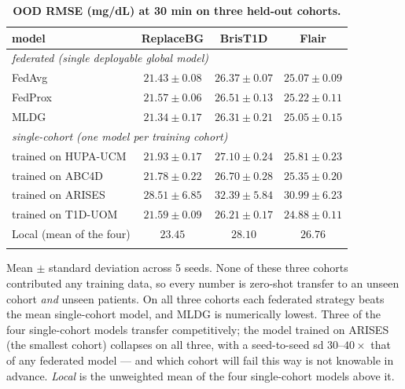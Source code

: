 \documentclass[10pt,letterpaper]{article}
\newlength\savedwidth
\newcommand\thickhline{\noalign{\global\savedwidth\arrayrulewidth\global\arrayrulewidth 2pt}%
\hline
\noalign{\global\arrayrulewidth\savedwidth}}
\begin{document}
\begin{table}[!ht]
\centering
\captionsetup{justification=centering,singlelinecheck=on}
\caption{\bf OOD RMSE (mg/dL) at 30 min on three held-out cohorts.}
\label{tab:ood}
\begin{tabular}{lccc}
\thickhline
model & ReplaceBG & BrisT1D & Flair \\
\hline
\multicolumn{4}{l}{\emph{federated (single deployable global model)}} \\
FedAvg  & $21.43 \pm 0.08$ & $26.37 \pm 0.07$ & $25.07 \pm 0.09$ \\
FedProx & $21.57 \pm 0.06$ & $26.51 \pm 0.13$ & $25.22 \pm 0.11$ \\
MLDG    & $\mathbf{21.34 \pm 0.17}$ & $\mathbf{26.31 \pm 0.21}$ & $\mathbf{25.05 \pm 0.15}$ \\
\hline
\multicolumn{4}{l}{\emph{single-cohort (one model per training cohort)}} \\
\;trained on HUPA-UCM & $21.93 \pm 0.17$ & $27.10 \pm 0.24$ & $25.81 \pm 0.23$ \\
\;trained on ABC4D    & $21.78 \pm 0.22$ & $26.70 \pm 0.28$ & $25.35 \pm 0.20$ \\
\;trained on ARISES   & $28.51 \pm 6.85$ & $32.39 \pm 5.84$ & $30.99 \pm 6.23$ \\
\;trained on T1D-UOM  & $21.59 \pm 0.09$ & $26.21 \pm 0.17$ & $24.88 \pm 0.11$ \\
Local (mean of the four) & $23.45$ & $28.10$ & $26.76$ \\
\thickhline
\end{tabular}
\begin{center}
{\small Mean $\pm$ standard deviation across 5 seeds. None of these three cohorts
contributed any training data, so every number is zero-shot transfer to an unseen
cohort \emph{and} unseen patients. On all three cohorts each federated strategy
beats the mean single-cohort model, and MLDG is numerically lowest. Three of the
four single-cohort models transfer competitively; the model trained on ARISES
(the smallest cohort) collapses on all three, with a seed-to-seed sd $30$--$40
\times$ that of any federated model --- and which cohort will fail this way is not
knowable in advance. \emph{Local} is the unweighted mean of the four
single-cohort models above it.}
\end{center}
\end{table}
\end{document}
